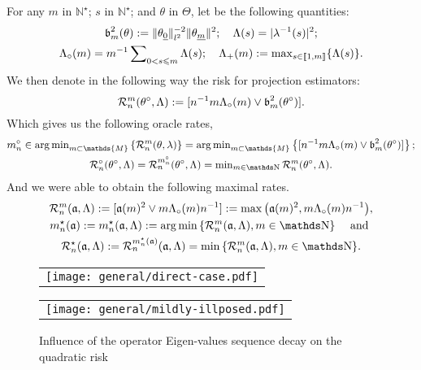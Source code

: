 \begin{nota*}
For any $m$ in $\mathds{N}^{\star}$; $s$ in $\mathds{N}^{\star}$; and $\theta$ in $\Theta$, let be the following quantities:
\begin{multline*}
\operatorname{\mathfrak{b}}_{m}^{2}(\theta) := \Vert \theta_{\underline{0}}\Vert_{l^{2}}^{-2} \Vert \theta_{\underline{m}} \Vert^{2}; \quad \Lambda(s) = \vert \lambda^{-1}(s) \vert^{2};\\
\Lambda_{\circ}(m) = m^{-1} \sum\nolimits_{0 < s \leqslant m} \Lambda(s); \quad \Lambda_{+}(m) := \max\nolimits_{s \in \llbracket 1, m \rrbracket}\{\Lambda(s)\}.
\end{multline*}
We then denote in the following way the risk for projection estimators:
\begin{equation*}
\mathcal{R}_{n}^{m}(\theta^{\circ}, \Lambda) := [n^{-1} m \Lambda_{\circ}(m) \vee \operatorname{\mathfrak{b}}_{m}^{2}(\theta^{\circ})].
\end{equation*}
Which gives us the following oracle rates,
\begin{multline*}
m^{\circ}_{n} \in \argmin\nolimits_{m \subset \mathds{M}}\left\{\mathcal{R}_{n}^{m}(\theta, \lambda)\right\} =  \argmin\nolimits_{m \subset \mathds{M}}\left\{[n^{-1} m \Lambda_{\circ}(m) \vee \b_{m}^{2}(\theta^{\circ})]\right\};\\
\mathcal{R}_{n}^{\circ}(\theta^{\circ}, \Lambda) = \mathcal{R}_{n}^{m_{n}^{\circ}}(\theta^{\circ}, \Lambda) = \min\nolimits_{m \in \N}\mathcal{R}_{n}^{m}(\theta^{\circ}, \Lambda).
\end{multline*}
And we were able to obtain the following maximal rates.
\begin{multline}
 \dRa{\Di}{\xdfCw[],\Lambda}:=[\xdfCw^2\vee\Di\oiSv \ssY^{-1}]:=\max\big(\xdfCw^2,\Di \oiSv \ssY^{-1}\big),\\
\hfill \mnDi(\xdfCw[]):=\mnDi(\xdfCw[],\Lambda):=\argmin\Nset[{\Di\in\N}]{\dRa{\Di}{\xdfCw[],\Lambda}}\quad\text{ and }\hfill\\\mnRa{\xdfCw[],\Lambda}:=\dRa{\mnDi({\xdfCw[]})}{\xdfCw[],\Lambda}=\min\Nset[{\Di\in\N}]{\dRa{\Di}{\xdfCw[],\Lambda}}.
\end{multline}
\assEnd
\end{nota*}

\begin{figure}
  \centering
  \begin{tabular}{@{}c@{}}
    \texttt{[image: general/direct-case.pdf]} \\[\abovecaptionskip]
  \end{tabular}
  \begin{tabular}{@{}c@{}}
    \texttt{[image: general/mildly-illposed.pdf]} \\[\abovecaptionskip]
  \end{tabular}
  \caption{Influence of the operator Eigen-values sequence decay on the quadratic risk}\label{igssm:mildsev}
\end{figure}

